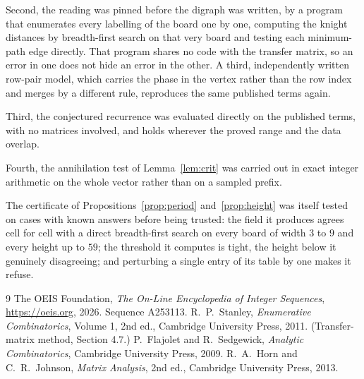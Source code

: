 \documentclass[11pt,a4paper]{article}
\theoremstyle{plain}
\theoremstyle{definition}
\begin{document}
Second, the reading was pinned before the digraph was written, by a program that enumerates
every labelling of the board one by one, computing the knight distances by breadth-first
search on that very board and testing each minimum-path edge directly. That program shares no
code with the transfer matrix, so an error in one does not hide an error in the other. A
third, independently written row-pair model, which carries the phase in the vertex rather than
the row index and merges by a different rule, reproduces the same published terms again.

Third, the conjectured recurrence was evaluated directly on the published terms, with no
matrices involved, and holds wherever the proved range and the data overlap.

Fourth, the annihilation test of Lemma~\ref{lem:crit} was carried out in exact integer
arithmetic on the whole vector rather than on a sampled prefix.

The certificate of Propositions~\ref{prop:period} and~\ref{prop:height} was itself tested
on cases with known answers before being trusted: the field it produces agrees cell for cell
with a direct breadth-first search on every board of width $3$ to $9$ and every height up to
$59$; the threshold it computes is tight, the height below it genuinely disagreeing; and
perturbing a single entry of its table by one makes it refuse.

\begin{thebibliography}{9}
 The OEIS Foundation, \emph{The On-Line Encyclopedia of Integer
Sequences}, \url{https://oeis.org}, 2026. Sequence A253113.
 R.~P.~Stanley, \emph{Enumerative Combinatorics}, Volume 1, 2nd ed.,
Cambridge University Press, 2011. (Transfer-matrix method, Section 4.7.)
 P.~Flajolet and R.~Sedgewick, \emph{Analytic Combinatorics}, Cambridge
University Press, 2009.
 R.~A.~Horn and C.~R.~Johnson, \emph{Matrix Analysis}, 2nd ed., Cambridge
University Press, 2013.
\end{thebibliography}
\end{document}
